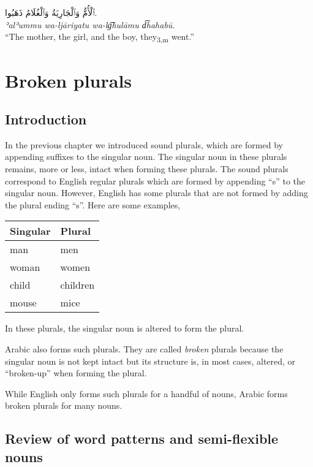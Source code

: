 \documentclass[
  10pt,
]{book}
\begin{document}
\foreignlanguage{arabic}{ٱلْأُمُّ وَٱلْجَارِيَةُ وَٱلْغُلَامُ ذَهَبُوا.}\\
\emph{ʾalʾummu wa-ljāriyatu wa-lg͡hulāmu d͡hahabū.}\\
\enquote{The mother, the girl, and the boy, they\textsubscript{3,m} went.}

\chapter{Broken plurals}\label{broken-plurals}

\section{Introduction}\label{introduction-9}

In the previous chapter we introduced sound plurals, which are formed by appending suffixes to the singular noun. The singular noun in these plurals remains, more or less, intact when forming these plurals. The sound plurals correspond to English regular plurals which are formed by appending \enquote{s} to the singular noun. However, English has some plurals that are not formed by adding the plural ending \enquote{s}. Here are some examples,

\begin{longtable}[]{@{}ll@{}}
\toprule\noalign{}
Singular & Plural \\
\midrule\noalign{}
\endhead
\bottomrule\noalign{}
\endlastfoot
man & men \\
woman & women \\
child & children \\
mouse & mice \\
\end{longtable}

In these plurals, the singular noun is altered to form the plural.

Arabic also forms such plurals. They are called \emph{broken} plurals because the singular noun is not kept intact but its structure is, in most cases, altered, or \enquote{broken-up} when forming the plural.

While English only forms such plurals for a handful of nouns, Arabic forms broken plurals for many nouns.

\section{Review of word patterns and semi-flexible nouns}\label{review-of-word-patterns-and-semi-flexible-nouns}
\end{document}
